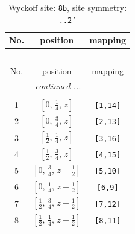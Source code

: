 \documentclass[fleqn,8pt]{jsarticle}
\begin{document}
\begin{longtable}{ccc}
\caption{Wyckoff site: {\tt 8b}, site symmetry: {\tt ..2'}}
 \\
 \hline \hline
No. & position & mapping \\ \hline \endfirsthead

\multicolumn{2}{l}{\tablename\ \thetable{}} \\
 \hline \hline
No. & position & mapping \\ \hline \endhead

 \hline \hline
\multicolumn{2}{r}{\footnotesize\it continued ...} \\ \endfoot

 \hline \hline
\multicolumn{2}{r}{} \\ \endlastfoot

1 & $\left[ 0,\, \frac{1}{4},\, z \right]$ & {\tt [1,14]} \\ \hline
2 & $\left[ 0,\, \frac{3}{4},\, z \right]$ & {\tt [2,13]} \\ \hline
3 & $\left[ \frac{1}{2},\, \frac{1}{4},\, z \right]$ & {\tt [3,16]} \\ \hline
4 & $\left[ \frac{1}{2},\, \frac{3}{4},\, z \right]$ & {\tt [4,15]} \\ \hline
5 & $\left[ 0,\, \frac{3}{4},\, z + \frac{1}{2} \right]$ & {\tt [5,10]} \\ \hline
6 & $\left[ 0,\, \frac{1}{4},\, z + \frac{1}{2} \right]$ & {\tt [6,9]} \\ \hline
7 & $\left[ \frac{1}{2},\, \frac{3}{4},\, z + \frac{1}{2} \right]$ & {\tt [7,12]} \\ \hline
8 & $\left[ \frac{1}{2},\, \frac{1}{4},\, z + \frac{1}{2} \right]$ & {\tt [8,11]} \\
\end{longtable}
\renewcommand{\arraystretch}{1.2}
\end{document}
